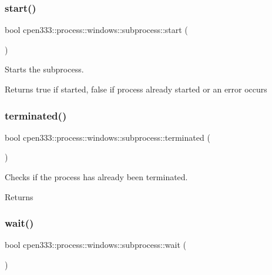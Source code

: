 \subsubsection{\texorpdfstring{start()}{start()}}
{\footnotesize\ttfamily bool cpen333\+::process\+::windows\+::subprocess\+::start (\begin{DoxyParamCaption}{ }\end{DoxyParamCaption})\hspace{0.3cm}{\ttfamily [inline]}}



Starts the subprocess. 

\begin{DoxyReturn}{Returns}
true if started, false if process already started or an error occurs 
\end{DoxyReturn}
\mbox{\label{classcpen333_1_1process_1_1windows_1_1subprocess_a7fc3a589bdd4cde9adb09fc3debf9bc9}} 
\subsubsection{\texorpdfstring{terminated()}{terminated()}}
{\footnotesize\ttfamily bool cpen333\+::process\+::windows\+::subprocess\+::terminated (\begin{DoxyParamCaption}{ }\end{DoxyParamCaption})\hspace{0.3cm}{\ttfamily [inline]}}



Checks if the process has already been terminated. 

\begin{DoxyReturn}{Returns}

\end{DoxyReturn}
\mbox{\label{classcpen333_1_1process_1_1windows_1_1subprocess_a54fe40167d1bf23bce4195c5aa34ec5f}} 
\subsubsection{\texorpdfstring{wait()}{wait()}}
{\footnotesize\ttfamily bool cpen333\+::process\+::windows\+::subprocess\+::wait (\begin{DoxyParamCaption}{ }\end{DoxyParamCaption})\hspace{0.3cm}{\ttfamily [inline]}}



